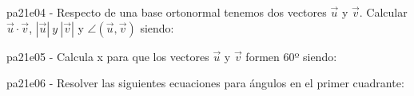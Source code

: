\documentclass[spanish, 11pt]{exam}
\begin{document}
\begin{questions}
\begin{multicols}{2}
\begin{parts}
        \end{parts}
        \end{multicols}
        \question pa21e04 - Respecto de una base ortonormal tenemos dos vectores $\overrightarrow{u}$ y $\overrightarrow{v}$.
Calcular $\overrightarrow{u}\cdot\overrightarrow{v}$, $|\overrightarrow{u}| \ y \ |\overrightarrow{v}|$ 
y $\angle(\overrightarrow{u},\overrightarrow{v})$ siendo:
        \begin{multicols}{2} 
        \end{multicols}
        \question pa21e05 - Calcula x para que los vectores
$\overrightarrow{u}$ y $\overrightarrow{v}$ formen 60º siendo: 
        \begin{multicols}{2} 
        \end{multicols}
        \question pa21e06 - Resolver las siguientes ecuaciones para ángulos en el primer cuadrante:
        \begin{multicols}{1} 

\end{multicols}
\end{questions}
\end{document}
